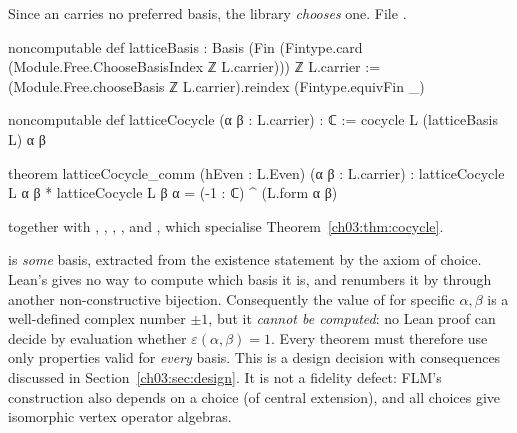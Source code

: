 Since an  carries no preferred basis, the library \emph{chooses} one.
\noindent File .
\begin{leancode}
noncomputable def latticeBasis :
    Basis (Fin (Fintype.card (Module.Free.ChooseBasisIndex ℤ L.carrier))) ℤ L.carrier :=
  (Module.Free.chooseBasis ℤ L.carrier).reindex (Fintype.equivFin _)

noncomputable def latticeCocycle (α β : L.carrier) : ℂ := cocycle L (latticeBasis L) α β

theorem latticeCocycle_comm (hEven : L.Even) (α β : L.carrier) :
    latticeCocycle L α β * latticeCocycle L β α = (-1 : ℂ) ^ (L.form α β)
\end{leancode}
together with , ,
, ,
 and , which specialise
Theorem~\ref{ch03:thm:cocycle}.

\begin{dictionary}
 is \emph{some} basis, extracted from the existence
statement  by the axiom of choice. Lean's  gives no way to
compute which basis it is, and  renumbers it by
 through another non-constructive bijection. Consequently the value of
 for specific $\alpha,\beta$ is a well-defined complex number $\pm1$, but
it \emph{cannot be computed}: no Lean proof can decide by evaluation whether
$\varepsilon(\alpha,\beta)=1$. Every theorem must therefore use only properties valid for
\emph{every} basis. This is a design decision with consequences discussed in
Section~\ref{ch03:sec:design}. It is not a fidelity defect: FLM's construction also depends on a
choice (of central extension), and all choices give isomorphic vertex operator algebras.
\end{dictionary}

